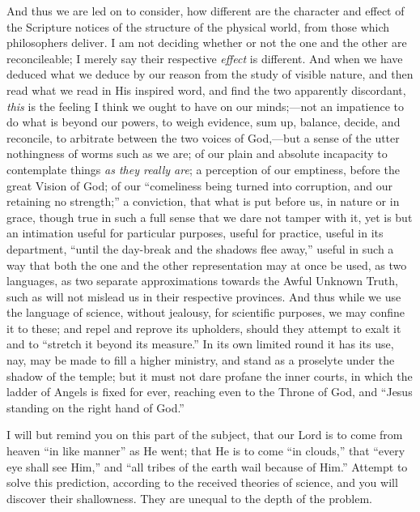 And thus we are led on to consider, how different are the character
and effect of the Scripture notices of the structure of the physical
world, from those which philosophers deliver. I am not deciding whether
or not the one and the other are reconcileable; I merely say their
respective \emph{effect} is different. And when we have deduced what we
deduce by our reason from the study of visible nature, and then read
what we read in His inspired word, and find the two apparently
discordant, \emph{this} is the feeling I think we ought to have on our
minds;—not an impatience to do what is beyond our powers, to weigh
evidence, sum up, balance, decide, and reconcile, to arbitrate between
the two voices of God,—but a sense of the utter nothingness of worms
such as we are; of our plain and absolute incapacity to contemplate
things \emph{as they really are}; a perception of our emptiness, before
the great Vision of God; of our ``comeliness being turned into
corruption, and our retaining no strength;'' a conviction, that what
is put before us, in nature or in grace, though true in such a full
sense that we dare not tamper with it, yet is but an intimation useful
for particular purposes, useful for practice, useful in its department,
``until the day-break and the shadows flee away,'' useful in
such a way that both the one and the other representation may at once be
used, as two languages, as two separate approximations towards the Awful
Unknown Truth, such as will not mislead us in their respective
provinces. And thus while we use the language of science, without
jealousy, for scientific purposes, we may confine it to these; and repel
and reprove its upholders, should they attempt to exalt it and to
``stretch it beyond its measure.'' In its own limited round it
has its use, nay, may be made to fill a higher ministry, and stand as a
proselyte under the shadow of the temple; but it must not dare profane
the inner courts, in which the ladder of Angels is fixed for ever,
reaching even to the Throne of God, and ``Jesus standing on the
right hand of God.''

I will but remind you on this part of the subject, that our Lord is
to come from heaven ``in like manner'' as He went; that He is to
come ``in clouds,'' that ``every eye shall see Him,''
and ``all tribes of the earth wail because of Him.'' Attempt to
solve this prediction, according to the received theories of science,
and you will discover their shallowness. They are unequal to the depth
of the problem.

